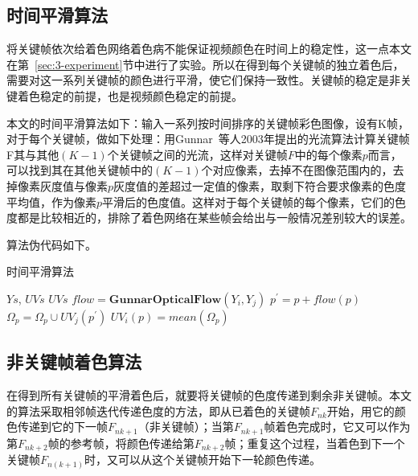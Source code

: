 \subsection{时间平滑算法}
\label{sec:3-temporal-smooth}

  将关键帧依次给着色网络着色病不能保证视频颜色在时间上的稳定性，这一点本文在第~\ref{sec:3-experiment}节中进行了实验。所以在得到每个关键帧的独立着色后，需要对这一系列关键帧的颜色进行平滑，使它们保持一致性。关键帧的稳定是非关键着色稳定的前提，也是视频颜色稳定的前提。

  本文的时间平滑算法如下：输入一系列按时间排序的关键帧彩色图像，设有K帧，对于每个关键帧，做如下处理：用Gunnar~\cite{DBLP:conf/scia/Farneback03}等人2003年提出的光流算法计算关键帧F其与其他$(K-1)$个关键帧之间的光流，这样对关键帧$F$中的每个像素$p$而言，可以找到其在其他关键帧中的$(K-1)$个对应像素，去掉不在图像范围内的，去掉像素灰度值与像素$p$灰度值的差超过一定值的像素，取剩下符合要求像素的色度平均值，作为像素$p$平滑后的色度值。这样对于每个关键帧的每个像素，它们的色度都是比较相近的，排除了着色网络在某些帧会给出与一般情况差别较大的误差。

  算法伪代码如下。

  \begin{algorithm}[H]
  \label{algo:5-temporal-smooth}
    \caption*{时间平滑算法}
    \begin{algorithmic}[1]
      \Require $Ys$, $UVs$
      \Ensure  $UVs$
            \State $flow = \textbf{GunnarOpticalFlow}(Y_i, Y_j)$
              \State $p^{'} = p + flow(p)$
                \State $\Omega_p = \Omega_p \cup UV_j(p^{'})$
              \EndIf
            \EndFor
          \EndFor
            \State $UV_i(p) = mean(\Omega_p)$
          \EndFor
        \EndFor
      \EndFunction
    \end{algorithmic}
  \end{algorithm}

\subsection{非关键帧着色算法}
\label{sec:3-interframe-color}

  在得到所有关键帧的平滑着色后，就要将关键帧的色度传递到剩余非关键帧。本文的算法采取相邻帧迭代传递色度的方法，即从已着色的关键帧$F_{nk}$开始，用它的颜色传递到它的下一帧$F_{nk+1}$（非关键帧）；当第$F_{nk+1}$帧着色完成时，它又可以作为第$F_{nk+2}$帧的参考帧，将颜色传递给第$F_{nk+2}$帧；重复这个过程，当着色到下一个关键帧$F_{n(k+1)}$时，又可以从这个关键帧开始下一轮颜色传递。

